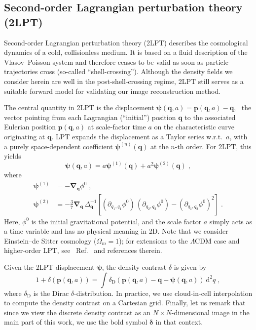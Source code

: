 \begin{subappendices}
\section{Second-order Lagrangian perturbation theory (2LPT)}
\label{apx:2lpt}
Second-order Lagrangian perturbation theory (2LPT) describes the cosmological dynamics of a cold, collisionless medium. It is based on a fluid description of the Vlasov--Poisson system \cite[\eg][]{Peebles:2020aa} and therefore ceases to be valid as soon as particle trajectories cross (so-called ``shell-crossing''). Although the density fields we consider herein are well in the post-shell-crossing regime, 2LPT still serves as a suitable forward model for validating our image reconstruction method.

The central quantity in 2LPT is the displacement $\bm \psi(\bm q, a) = \bm p(\bm q, a) - \bm q$, \ie\ the vector pointing from each Lagrangian (``initial'') position $\bm q$ to the associated Eulerian position ${\bm p}({\bm q}, a)$ at scale-factor time $a$ on the characteristic curve originating at $\bm q$. LPT expands the displacement as a Taylor series w.r.t.\ $a$, with a purely space-dependent coefficient $\bm \psi^{(n)}(\bm q)$ at the $n$-th order. For 2LPT, this yields
\begin{equation}
    \bm \psi(\bm q, a) = a \bm \psi^{(1)}(\bm q) + a^2 \bm \psi^{(2)}(\bm q) \;,
\end{equation}
where 
\begin{subequations}
\begin{align}
    \bm \psi^{(1)} &= - \bm \nabla_{\bm q} \phi^0 \;, \\
    \bm \psi^{(2)} &= -\frac{3}{7} \bm \nabla_{\bm q} \, \Delta_{\bm q}^{-1} \left[(\partial_{q_1, q_1} \phi^0) \, (\partial_{q_2, q_2} \phi^0) - (\partial_{q_1, q_2} \phi^0)^2 \right] \;.
\end{align}
\end{subequations}
Here, $\phi^0$ is the initial gravitational potential, and the scale factor $a$ simply acts as a time variable and has no physical meaning in 2D.  Note that we consider Einstein--de Sitter cosmology ($\Omega_m = 1$); for extensions to the $\Lambda$CDM case and higher-order LPT, see \eg~Ref.~\cite{Rampf:2022tpg} and references therein.

Given the 2LPT displacement $\bm \psi$, the density contrast $\delta$ is given by
\begin{equation}
    1 + \delta(\bm p(\bm q, a)) = \int \delta_\text{D}(\bm p(\bm q, a) - \bm q - \bm \psi(\bm q, a)) \ \mathrm{d}^2q \;,
\end{equation}
where $\delta_\text{D}$ is the Dirac $\delta$-distribution. In practice, we use cloud-in-cell interpolation \cite[\eg][]{HockneyEastwood:1988} to compute the density contrast on a Cartesian grid. Finally, let us remark that since we view the discrete density contrast as an $N \times N$-dimensional image in the main part of this work, we use the bold symbol $\bm \delta$ in that context.

\end{subappendices}
